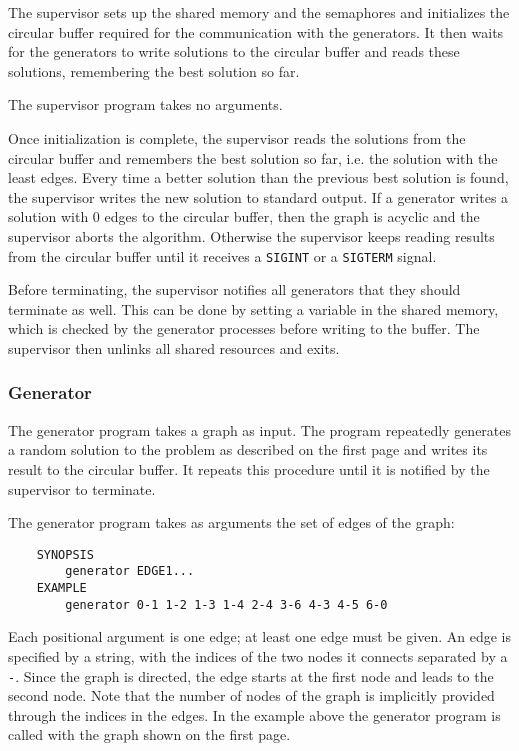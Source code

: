 The supervisor sets up the shared memory and the semaphores
and initializes the circular buffer
required for the communication with the generators.
It then waits for the generators to write solutions to the circular buffer
and reads these solutions, remembering the best solution so far.

The supervisor program takes no arguments.

Once initialization is complete,
the supervisor reads the solutions from the circular buffer
and remembers the best solution so far, i.e. the solution with the least edges.
Every time a better solution than the previous best solution is found,
the supervisor writes the new solution to standard output.
If a generator writes a solution with 0 edges to the circular buffer,
then the graph is acyclic and the supervisor aborts the algorithm.
Otherwise the supervisor keeps reading results from the circular buffer
until it receives a \texttt{SIGINT} or a \texttt{SIGTERM} signal.

Before terminating, the supervisor notifies all generators
that they should terminate as well.
This can be done by setting a variable in the shared memory,
which is checked by the generator processes before writing to the buffer.
The supervisor then unlinks all shared resources and exits.

\subsubsection*{Generator}

The generator program takes a graph as input.
The program repeatedly generates a random solution to the problem as described on the first page
and writes its result to the circular buffer.
It repeats this procedure until it is notified by the supervisor to terminate.

The generator program takes as arguments the set of edges of the graph:

\begin{verbatim}
    SYNOPSIS
        generator EDGE1...
    EXAMPLE
        generator 0-1 1-2 1-3 1-4 2-4 3-6 4-3 4-5 6-0
\end{verbatim}

Each positional argument is one edge; at least one edge must be given.
An edge is specified by a string,
with the indices of the two nodes it connects separated by a \texttt{-}.
Since the graph is directed,
the edge starts at the first node and leads to the second node.
Note that the number of nodes of the graph is implicitly provided
through the indices in the edges.
In the example above the generator program is called with the graph shown on the first page.

